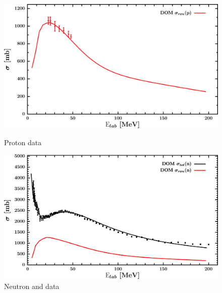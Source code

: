 \begin{figure}[H]
    \centering
    \begin{minipage}{0.45\textwidth}
        \centering
        \includegraphics[width=1.0\textwidth]{figures/ca48_protonInelastic.png}
        \caption{Proton \rxn data}
        \label{DOMFitData_ca48_proton_inelastic}
    \end{minipage}\hfill
    \begin{minipage}{0.45\textwidth}
        \centering
        \includegraphics[width=1.0\textwidth]{figures/ca48_neutronInelastic.png}
        \caption{Neutron \rxn and \tot data}
        \label{DOMFitData_ca48_neutron_inelastic}
    \end{minipage}
\end{figure}

\afterpage{\clearpage}

